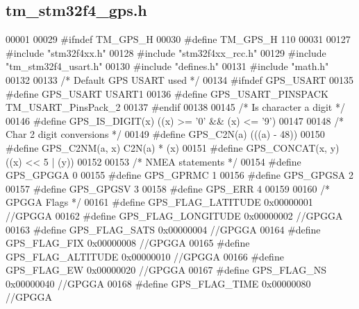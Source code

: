 \hypertarget{tm__stm32f4__gps_8h_source}{}\subsection{tm\+\_\+stm32f4\+\_\+gps.\+h}

\begin{DoxyCode}
00001 
00029 \textcolor{preprocessor}{#ifndef TM\_GPS\_H}
00030 \textcolor{preprocessor}{#define TM\_GPS\_H 110}
00031 
00127 \textcolor{preprocessor}{#include "stm32f4xx.h"}
00128 \textcolor{preprocessor}{#include "stm32f4xx\_rcc.h"}
00129 \textcolor{preprocessor}{#include "tm\_stm32f4\_usart.h"}
00130 \textcolor{preprocessor}{#include "defines.h"}
00131 \textcolor{preprocessor}{#include "math.h"}
00132 
00133 \textcolor{comment}{/* Default GPS USART used */}
00134 \textcolor{preprocessor}{#ifndef GPS\_USART}
00135 \textcolor{preprocessor}{#define GPS\_USART               USART1}
00136 \textcolor{preprocessor}{#define GPS\_USART\_PINSPACK      TM\_USART\_PinsPack\_2}
00137 \textcolor{preprocessor}{#endif}
00138 
00145 \textcolor{comment}{/* Is character a digit */}
00146 \textcolor{preprocessor}{#define GPS\_IS\_DIGIT(x)         ((x) >= '0' && (x) <= '9')}
00147 
00148 \textcolor{comment}{/* Char 2 digit conversions */}
00149 \textcolor{preprocessor}{#define GPS\_C2N(a)              (((a) - 48))}
00150 \textcolor{preprocessor}{#define GPS\_C2NM(a, x)          C2N(a) * (x)}
00151 \textcolor{preprocessor}{#define GPS\_CONCAT(x, y)        ((x) << 5 | (y))}
00152 
00153 \textcolor{comment}{/* NMEA statements */}
00154 \textcolor{preprocessor}{#define GPS\_GPGGA               0}
00155 \textcolor{preprocessor}{#define GPS\_GPRMC               1}
00156 \textcolor{preprocessor}{#define GPS\_GPGSA               2}
00157 \textcolor{preprocessor}{#define GPS\_GPGSV               3}
00158 \textcolor{preprocessor}{#define GPS\_ERR                 4}
00159 
00160 \textcolor{comment}{/* GPGGA Flags */}
00161 \textcolor{preprocessor}{#define GPS\_FLAG\_LATITUDE       0x00000001  //GPGGA}
00162 \textcolor{preprocessor}{#define GPS\_FLAG\_LONGITUDE      0x00000002  //GPGGA}
00163 \textcolor{preprocessor}{#define GPS\_FLAG\_SATS           0x00000004  //GPGGA}
00164 \textcolor{preprocessor}{#define GPS\_FLAG\_FIX            0x00000008  //GPGGA}
00165 \textcolor{preprocessor}{#define GPS\_FLAG\_ALTITUDE       0x00000010  //GPGGA}
00166 \textcolor{preprocessor}{#define GPS\_FLAG\_EW             0x00000020  //GPGGA}
00167 \textcolor{preprocessor}{#define GPS\_FLAG\_NS             0x00000040  //GPGGA}
00168 \textcolor{preprocessor}{#define GPS\_FLAG\_TIME           0x00000080  //GPGGA}

\end{DoxyCode}
